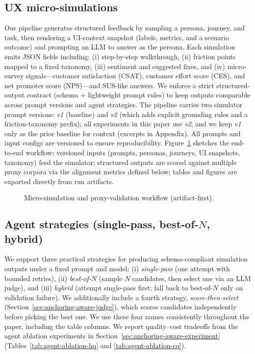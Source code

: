 \subsection{UX micro-simulations}
Our pipeline generates structured feedback by sampling a persona, journey, and task, then rendering a UI-context
snapshot (labels, metrics, and a scenario outcome) and prompting an LLM to answer as the persona.
Each simulation emits JSON fields including:
(i) step-by-step walkthrough, (ii) friction points mapped to a fixed taxonomy,
(iii) sentiment and suggested fixes, and (iv) micro-survey signals---customer satisfaction (CSAT), customer effort score (CES), and net promoter score (NPS)---and SUS-like answers.
We enforce a strict structured-output contract (schema + lightweight prompt rules) to keep outputs comparable across prompt versions and agent strategies.
The pipeline carries two simulator prompt versions: \emph{v1} (baseline) and \emph{v2} (which adds explicit grounding rules and a friction-taxonomy prefix); all experiments in this paper use \emph{v2}, and we keep \emph{v1} only as the prior baseline for context (excerpts in Appendix).
All prompts and input configs are versioned to ensure reproducibility.
Figure~\ref{fig:pipeline} sketches the end-to-end workflow: versioned inputs (prompts, personas, journeys, UI snapshots, taxonomy) feed the simulator; structured outputs are scored against multiple proxy corpora via the alignment metrics defined below; tables and figures are exported directly from run artifacts.
\ifx\uxpipelinefig\empty\else
\begin{figure}[t]
  \centering
  \resizebox{0.98\linewidth}{!}{}
  \caption{Micro-simulation and proxy-validation workflow (artifact-first).}
  \label{fig:pipeline}
\end{figure}
\fi

\subsection{Agent strategies (single-pass, best-of-\texorpdfstring{$N$}{N}, hybrid)}
\label{sec:agent-strategies}
We support three practical strategies for producing schema-compliant simulation outputs under a fixed prompt and model:
(i) \emph{single-pass} (one attempt with bounded retries),
(ii) \emph{best-of-$N$} (sample $N$ candidates, then select one via an LLM judge), and
(iii) \emph{hybrid} (attempt single-pass first; fall back to best-of-$N$ only on validation failure).
We additionally include a fourth strategy, \emph{score-then-select} (Section~\ref{sec:anchoring-aware-judge}), which scores candidates independently before picking the best one.
We use these four names consistently throughout the paper, including the table columns.
We report quality--cost tradeoffs from the agent ablation experiments in Section~\ref{sec:anchoring-aware-experiment} (Tables~\ref{tab:agent-ablation-hq} and \ref{tab:agent-ablation-cq}).

